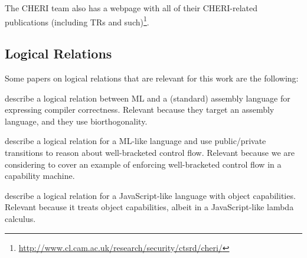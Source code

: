 \documentclass{article}
\begin{document}
The CHERI team also has a webpage with all of their CHERI-related publications
(including TRs and
such)\footnote{\url{http://www.cl.cam.ac.uk/research/security/ctsrd/cheri/}}.

\subsection{Logical Relations}
\label{sec:rw-log-rel}

Some papers on logical relations that are relevant for this work are the
following:

\cite{Hur:2011:KLR:1926385.1926402} describe a logical relation between ML and
a (standard) assembly language for expressing compiler correctness.  Relevant
because they target an assembly language, and they use biorthogonality.

\cite{Dreyer:2010:IHS:1863543.1863566} describe a logical relation for a ML-like
language and use public/private transitions to reason about well-bracketed
control flow. Relevant because we are considering to cover an example of
enforcing well-bracketed control flow in a capability machine.

\cite{Devriese:2016ObjCap} describe a logical relation for a JavaScript-like
language with object capabilities.  Relevant because it treats object
capabilities, albeit in a JavaScript-like lambda calculus.



\end{document}
